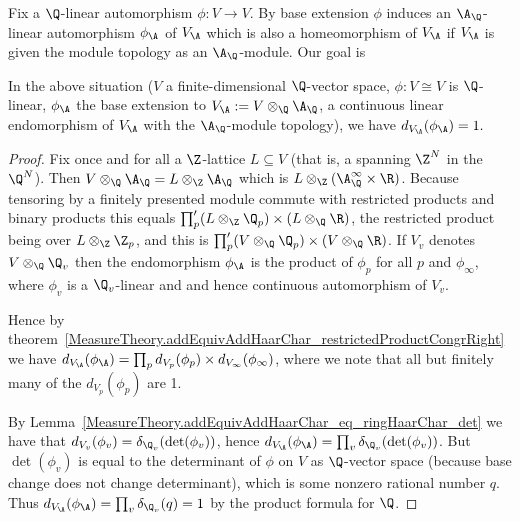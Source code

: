   Fix a $\Q$-linear automorphism $\phi:V\to V$. By base extension $\phi$ induces
  an $\A_{\Q}$-linear automorphism $\phi_{\A}$ of $V_{\A}$ which is also a homeomorphism of $V_{\A}$
  if $V_{\A}$ is given the module topology as an $\A_{\Q}$-module. Our goal is

  \begin{theorem}
    \label{MeasureTheory.addHaarScalarFactor_tensor_adeles_eq_one}
    \leanok
    In the above situation ($V$ a finite-dimensional $\Q$-vector space, $\phi:V\cong V$ is
    $\Q$-linear, $\phi_{\A}$ the base extension to $V_{\A}:=V\otimes_{\Q}{\A_{\Q}}$, a continuous linear
    endomorphism of $V_{\A}$ with the $\A_{\Q}$-module topology), we have $d_{V_{\A}}(\phi_{\A})=1.$
  \end{theorem}
  \begin{proof}
    Fix once and for all a $\Z$-lattice $L\subseteq V$
    (that is, a spanning $\Z^N$ in the $\Q^N$). Then $V\otimes_{\Q}\A_{\Q}=L\otimes_{\Z}\A_{\Q}$
    which is $L\otimes_{\Z}(\A_{\Q}^\infty\times\R)$.
    Because tensoring by a finitely presented module commute with restricted products and binary
    products this equals $\prod'_p(L\otimes_{\Z}\Q_p)\times(L\otimes_{\Q}\R)$, the restricted
    product being over $L\otimes_{\Z}\Z_p$, and this is $\prod'_p(V\otimes_{\Q}\Q_p)\times(V\otimes_{\Q}\R)$.
    If $V_v$ denotes $V\otimes_{\Q}\Q_v$ then the endomorphism $\phi_{\A}$ is the product of
    $\phi_p$ for all $p$ and $\phi_\infty$,
    where $\phi_v$ is a $\Q_v$-linear and and hence continuous automorphism of $V_v$.

    Hence by theorem~\ref{MeasureTheory.addEquivAddHaarChar_restrictedProductCongrRight}
    we have $d_{V_{\A}}(\phi_{\A})=\prod_p d_{V_p}(\phi_p)\times d_{V_\infty}(\phi_\infty)$,
    where we note that all but finitely many of the $d_{V_p}(\phi_p)$ are 1.

    By Lemma~\ref{MeasureTheory.addEquivAddHaarChar_eq_ringHaarChar_det} we have that
    $d_{V_v}(\phi_v)=\delta_{\Q_v}(\det(\phi_v))$, hence $d_{V_{\A}}(\phi_{\A})=\prod_v\delta_{\Q_v}(\det(\phi_v))$.
    But $\det(\phi_v)$ is equal to the determinant of $\phi$ on $V$ as $\Q$-vector space (because
    base change does not change determinant),
    which is some nonzero rational number $q$. Thus $d_{V_{\A}}(\phi_{\A})=\prod_v\delta_{\Q_v}(q)=1$
    by the product formula for $\Q$.
  \end{proof}

